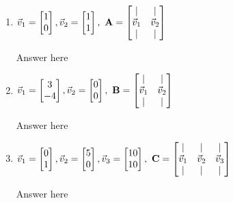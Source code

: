 \documentclass[11pt]{article}
\begin{document}
\begin{enumerate}
        \begin{enumerate}
            \item $\vec{v}_1 = \begin{bmatrix}1\\0\end{bmatrix}, \vec{v}_2 = \begin{bmatrix}1\\1\end{bmatrix}, \ \mbox{{\bfseries A}} = \begin{bmatrix}\vert&\vert \\ \vec{v}_1&\vec{v}_2 \\ \vert&\vert \end{bmatrix}$
            \begin{Answer}
                Answer here
            \end{Answer}
            
            \item $\vec{v}_1 = \begin{bmatrix}3\\-4\end{bmatrix}, \vec{v}_2 = \begin{bmatrix}0\\0\end{bmatrix}, \ \mbox{{\bfseries B}} = \begin{bmatrix}\vert&\vert \\ \vec{v}_1&\vec{v}_2 \\ \vert&\vert \end{bmatrix}$
            \begin{Answer}
                Answer here
            \end{Answer}
            
            \item $\vec{v}_1 = \begin{bmatrix}0\\1\end{bmatrix}, \vec{v}_2 = \begin{bmatrix}5\\0 \end{bmatrix}, \vec{v}_3 = \begin{bmatrix} 10\\10 \end{bmatrix}, \ \mbox{{\bfseries C}} = \begin{bmatrix}\vert&\vert&\vert \\ \vec{v}_1&\vec{v}_2&\vec{v}_3 \\ \vert&\vert&\vert \end{bmatrix}$
            \begin{Answer}
                Answer here
            \end{Answer}
            

\end{enumerate}
\end{enumerate}
\end{document}
